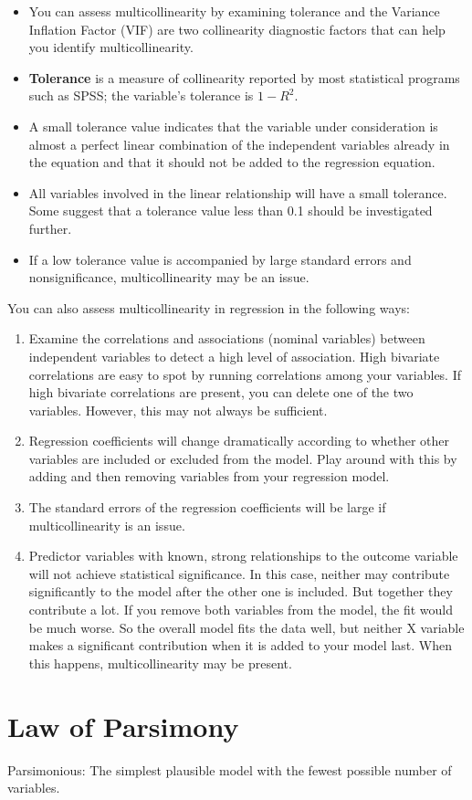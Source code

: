 \documentclass[a4paper,12pt]{article}
\begin{document}
\begin{itemize}
\item You can assess multicollinearity by examining tolerance and the Variance Inflation Factor (VIF) are two collinearity diagnostic factors that can help you identify multicollinearity. 
\item \textbf{Tolerance} is a measure of collinearity reported by most statistical programs such as SPSS; the variable’s tolerance is $1-R^2$. 
\item A small tolerance value indicates that the variable under consideration is almost a perfect linear combination of the independent variables already in the equation and that it should not be added to the regression equation. 
\item All variables involved in the linear relationship will have a small tolerance. Some suggest that a tolerance value less than 0.1 should be investigated further. 
\item If a low tolerance value is accompanied by large standard errors and nonsignificance, multicollinearity may be an issue.
\end{itemize}



\newpage

You can also assess multicollinearity in regression in the following ways:

\begin{enumerate}
\item Examine the correlations and associations (nominal variables) between independent variables to detect a high level of association. High bivariate correlations are easy to spot by running correlations among your variables. If high bivariate correlations are present, you can delete one of the two variables. However, this may not always be sufficient.

\item Regression coefficients will change dramatically according to whether other variables are included or excluded from the model. Play around with this by adding and then removing variables from your regression model.

\item The standard errors of the regression coefficients will be large if multicollinearity is an issue.

\item Predictor variables with known, strong relationships to the outcome variable will not achieve statistical significance. In this case, neither may contribute significantly to the model after the other one is included. But together they contribute a lot. If you remove both variables from the model, the fit would be much worse. So the overall model fits the data well, but neither X variable makes a significant contribution when it is added to your model last. When this happens, multicollinearity may be present.
\end{enumerate}

\newpage
\section{Law of Parsimony}
Parsimonious: The simplest plausible model with the fewest possible number of variables.
\end{document}
